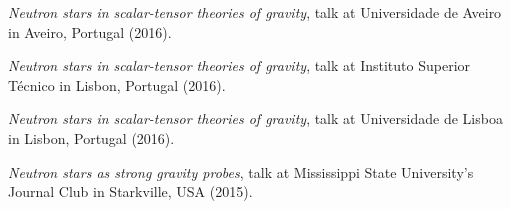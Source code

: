 \documentclass[11pt]{article}
\begin{document}
\begin{etaremune}[topsep=0pt,partopsep=0pt]
    \item
    \emph{Neutron stars in scalar-tensor theories of gravity},
    talk at Universidade de Aveiro
    in Aveiro, Portugal (2016).

    \item
    \emph{Neutron stars in scalar-tensor theories of gravity},
    talk at Instituto Superior T\'ecnico
    in Lisbon, Portugal (2016).

    \item
    \emph{Neutron stars in scalar-tensor theories of gravity},
    talk at Universidade de Lisboa
    in Lisbon, Portugal (2016).

    \item
    \emph{Neutron stars as strong gravity probes},
    talk at Mississippi State University's Journal Club
    in Starkville, USA (2015).
\end{etaremune}
\end{document}
